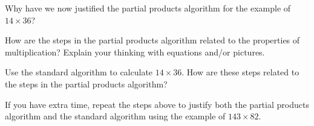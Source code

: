 \documentclass[nooutcomes,noauthor]{ximera}
\begin{document}
\begin{problem}
Why have we now justified the partial products algorithm for the example of $14 \times 36$?
\end{problem}


\begin{problem}
How are the steps in the partial products algorithm related to the properties of multiplication? Explain your thinking with equations and/or pictures.
\end{problem}



\begin{problem}
Use the standard algorithm to calculate $14 \times 36$. How are these steps related to the steps in the partial products algorithm?
\end{problem}



\begin{problem}
If you have extra time, repeat the steps above to justify both the partial products algorithm and the standard algorithm using the example of $143 \times 82$.
\end{problem}



\newpage
\end{document}
